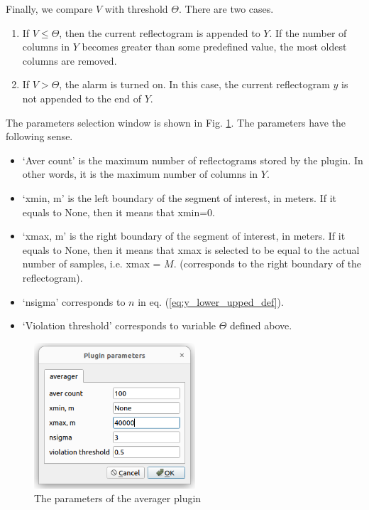 	Finally, we compare $V$ with threshold $\Theta$. There are two cases.
	\begin{enumerate}
		\item If $V \leq \Theta$, then the current reflectogram is appended to $Y$. If the number of columns in $Y$ becomes greater than some predefined value, the most oldest columns are removed.
		\item If $V > \Theta$, the alarm is turned on. In this case, the current reflectogram $y$ is not appended to the end of $Y$.
	\end{enumerate} 
			
	
The parameters selection window is shown in Fig. \ref{fig:AverParamsWnd}. The parameters have the following sense.
\begin{itemize}
	\item `Aver count' is the maximum number of reflectograms stored by the plugin. In other words, it is the maximum number of columns in $Y$.
	\item `xmin, m' is the left boundary of the segment of interest, in meters. If it equals to None, then it means that xmin=0.
	\item `xmax, m' is the right boundary of the segment of interest, in meters. If it equals to None, then it means that xmax is selected to be equal to the actual number of samples, i.e. xmax = $M$. (corresponds to the right boundary of the reflectogram).
	\item `nsigma' corresponds to $n$ in eq. (\ref{eq:y_lower_upped_def}).
	\item `Violation threshold' corresponds to variable $\Theta$ defined above.
\end{itemize}
	
\begin{figure}[h]
	\begin{center}
		\includegraphics[width=6cm]{pictures/averager_parameters.png}
	\end{center}
	\caption{The parameters of the averager plugin}
	\label{fig:AverParamsWnd}
\end{figure}

